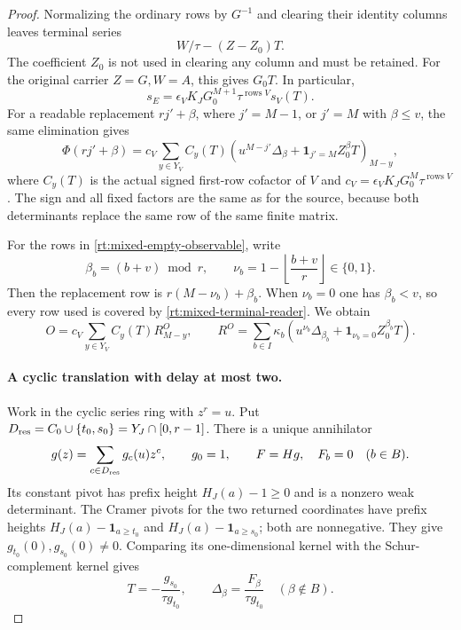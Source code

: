 \documentclass[11pt,a4paper]{amsart}
\numberwithin{equation}{section}
\theoremstyle{plain}
\theoremstyle{definition}
\newcommand{\one}{\mathbf1}
\begin{document}
\begin{proof}
Normalizing the ordinary rows by \(G^{-1}\) and clearing their
identity columns leaves terminal series
\[
 W/\tau-(Z-Z_0)T.
\]
The coefficient \(Z_0\) is not used in clearing any column and must
be retained.  For the original carrier \(Z=G,W=A\), this gives
\(G_0T\).  In particular,
\begin{equation}\label{rt:mixed-source-normalization}
 s_E=\epsilon_V K_JG_0^{M+1}\tau^{\operatorname{rows}V}s_V(T).
\end{equation}
For a readable replacement \(rj'+\beta\), where \(j'=M-1\), or
\(j'=M\) with \(\beta\le v\), the same elimination gives
\begin{equation}\label{rt:mixed-terminal-reader}
 \Phi(rj'+\beta)=c_V\sum_{y\in Y_V}C_y(T)
 \left(u^{M-j'}\Delta_\beta+
              \one_{j'=M}Z^\beta_0T\right)_{M-y},
\end{equation}
where \(C_y(T)\) is the actual signed first-row cofactor of \(V\) and
\(c_V=\epsilon_VK_JG_0^M\tau^{\operatorname{rows}V}\).
The sign and all fixed factors are the same as for the source,
because both determinants replace the same row of the same finite
matrix.

For the rows in \eqref{rt:mixed-empty-observable}, write
\[
 \beta_b=(b+v)\bmod r,\qquad
 \nu_b=1-\left\lfloor\frac{b+v}{r}\right\rfloor\in\{0,1\}.
\]
Then the replacement row is \(r(M-\nu_b)+\beta_b\).  When
\(\nu_b=0\) one has \(\beta_b<v\), so every row used is covered by
\eqref{rt:mixed-terminal-reader}.  We obtain
\begin{equation}\label{rt:mixed-combined-reader}
 O=c_V\sum_{y\in Y_V}C_y(T)R^O_{M-y},\qquad
 R^O=\sum_{b\in I}\kappa_b
       \left(u^{\nu_b}\Delta_{\beta_b}
                        +\one_{\nu_b=0}Z^{\beta_b}_0T\right).
\end{equation}

\paragraph{A cyclic translation with delay at most two.}
Work in the cyclic series ring with \(z^r=u\).  Put
\(D_{\rm res}=C_0\cup\{t_0,s_0\}=Y_J\cap[0,r-1]\).
There is a unique annihilator
\[
 g(z)=\sum_{c\in D_{\rm res}}g_c(u)z^c,\qquad g_0=1,
 \qquad F=Hg,\quad F_b=0\quad(b\in B).
\]
Its constant pivot has prefix height \(H_J(a)-1\ge0\) and is a
nonzero weak determinant.  The Cramer pivots for the two returned
coordinates have prefix heights
\(H_J(a)-\one_{a\ge t_0}\) and
\(H_J(a)-\one_{a\ge s_0}\); both are nonnegative.  They give
\(g_{t_0}(0),g_{s_0}(0)\ne0\).  Comparing its one-dimensional
kernel with the Schur-complement kernel gives
\begin{equation}\label{rt:mixed-cyclic-kernel}
 T=-\frac{g_{s_0}}{\tau g_{t_0}},\qquad
 \Delta_\beta=\frac{F_\beta}{\tau g_{t_0}}\quad(\beta\notin B).
\end{equation}


\end{proof}
\end{document}
